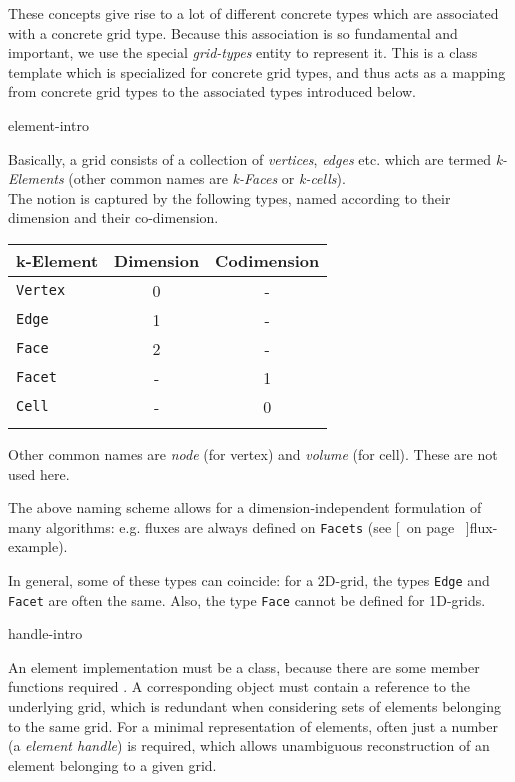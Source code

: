   These concepts give rise to a lot of different concrete types which are associated with a
  concrete grid type.
  Because this association is so fundamental and important,
  we use the special  {\em grid-types\/} entity to represent it.
  This is a class template which is specialized for concrete grid types,
  and thus acts as a mapping from  concrete grid types to the associated types introduced below.
  
  \begin{Label}{element-intro}
  \end{Label}

  Basically, a grid consists of a collection of {\em vertices\/}, {\em edges\/}
  etc. which are termed {\em k-Elements\/} (other common
  names are {\em k-Faces\/} or {\em k-cells\/}). 
  \\
  The notion is captured by the following types, named according to their dimension and their
  co-dimension.

      
  \begin{tabular}{lcc} \\ \hline
    \bf  k-Element &  \bf  Dimension &  \bf  Codimension  \\ \hline
    {\tt Vertex} &   0 &   -  \\
    {\tt Edge} &   1 &   -  \\ 
    {\tt Face} &   2 &   -  \\
    {\tt Facet} &   - &   1  \\
    {\tt Cell} &   - &   0  \\ \hline \\
  \end{tabular}
  
  Other common names are {\em node\/} (for vertex) and {\em volume\/} (for cell).
  These are not used here.
        
  The above naming scheme allows for a dimension-independent
  formulation of many algorithms: e.g. fluxes are always defined on {\tt Facets}
  (see [~on page \pageref{flux-example}~]{flux-example}).
      
  In general, some of these types can coincide: for a 2D-grid, the types {\tt Edge}
  and {\tt Facet} are often the same. 
  Also,  the type {\tt Face} cannot be defined for 1D-grids.

  \begin{Label}{handle-intro}
  \end{Label}
   An element  implementation must be a class, 
   because there are some member functions
   required . 
   A corresponding object must contain a reference to the underlying grid,
   which is redundant when considering sets of elements belonging to the same grid.
   For a minimal representation of elements, often just a number (a {\em element handle\/})
   is required, which allows unambiguous reconstruction of an element belonging to a given grid.
   

